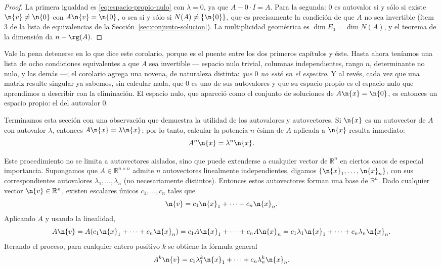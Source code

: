 \begin{proof}
La primera igualdad es \eqref{eq:espacio-propio-nulo} con $\lambda=0$, ya que
$A-0\cdot I=A$. Para la segunda: $0$ es autovalor si y sólo si existe $\n{v}\neq\n{0}$
con $A\n{v}=\n{0}$, o sea si y sólo si $N(A)\neq\{\n{0}\}$, que es precisamente la
condición de que $A$ no sea invertible (ítem 3 de la lista de equivalencias de la
Sección~\ref{sec:conjunto-solucion}). La multiplicidad geométrica es
$\dim E_0=\dim N(A)$, y el teorema de la dimensión da $n-\rg(A)$.
\end{proof}

Vale la pena detenerse en lo que dice este corolario, porque es el puente entre los dos
primeros capítulos y éste. Hasta ahora teníamos una lista de ocho condiciones
equivalentes a que $A$ sea invertible --- espacio nulo trivial, columnas independientes,
rango $n$, determinante no nulo, y las demás ---; el corolario agrega una novena, de
naturaleza distinta: \emph{que $0$ no esté en el espectro}. Y al revés, cada vez que
una matriz resulte singular ya sabemos, sin calcular nada, que $0$ es uno de sus
autovalores y que su espacio propio es el espacio nulo que aprendimos a describir con
la eliminación. El espacio nulo, que apareció como el conjunto de soluciones de
$A\n{x}=\n{0}$, es entonces un espacio propio: el del autovalor $0$.

Terminamos esta sección con una observación que demuestra la utilidad de los autovalores y autovectores. Si $\n{x}$ es un autovector de $A$ con autovalor $\lambda$, entonces $A\n{x} = \lambda \n{x}$; por lo tanto, calcular la potencia $n$-ésima de $A$ aplicada a $\n{x}$ resulta inmediato:
\[
A^n \n{x} = \lambda^n \n{x}.
\]

Este procedimiento no se limita a autovectores aislados, sino que puede extenderse a cualquier vector de $\mathbb{R}^n$ en ciertos casos de especial importancia. Supongamos que $A\in\mathbb{R}^{n\times n}$ admite $n$ autovectores linealmente independientes, digamos $\{\n{x}_1,\dots,\n{x}_n\}$, con sus correspondientes autovalores $\lambda_1,\dots,\lambda_n$ (no necesariamente distintos). Entonces estos autovectores forman una base de $\mathbb{R}^n$. Dado cualquier vector $\n{v}\in\mathbb{R}^n$, existen escalares únicos $c_1,\dots,c_n$ tales que
\[
\n{v} = c_1 \n{x}_1 + \cdots + c_n \n{x}_n.
\]
Aplicando $A$ y usando la linealidad,
\[
A\n{v} = A(c_1 \n{x}_1 + \cdots + c_n \n{x}_n) = c_1 A\n{x}_1 + \cdots + c_n A\n{x}_n = c_1 \lambda_1 \n{x}_1 + \cdots + c_n \lambda_n \n{x}_n.
\]
Iterando el proceso, para cualquier entero positivo $k$ se obtiene la fórmula general
\[
A^k \n{v} = c_1 \lambda_1^k \n{x}_1 + \cdots + c_n \lambda_n^k \n{x}_n.
\]

